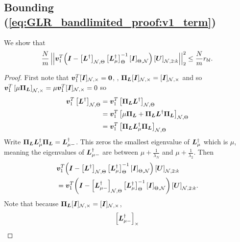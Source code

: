 \subsection{Bounding (\ref{eq:GLR_bandlimited_proof:v1_term})}
We show that 
\begin{equation}
    {\frac{N}{m}}\sqnormvec{\vect{v}_{1}^{T}{\left( \matr{I} - \msubgen[\set{N},\Theta]{\matr{L}^{\dagger}} \msubgen[\Theta]{ \matr{L}_{\mu}^{\dagger}}^{-1}\msubgen[\Theta,\set{N}]{\matr{I}}\right)\msubgen[\set{N},2:k]{\matr{U}}}} \leq \frac{N}{m} r_{bl}.
\end{equation}

\begin{proof} 
First note that $\vect{v}_{1}^{T}\matrsub[N,\Theta]{I} = \vect{0}$, , $\projgen{\matr{L}}\matrsub[N,\Theta]{I} = \matrsub[N,\Theta]{I}$ and so $\vect{v}_{1}^{T}\msub[N,\Theta]{\mu\projgen{\matr{L}}} = \mu \vect{v}_{1}^{T}\matrsub[N,\Theta]{I} = 0$ so 
\begin{align}
\vect{v}_{1}^{T}\msubgen[\set{N},\Theta]{\matr{L}^{\dagger}} &= \vect{v}_{1}^{T} \msubgen[\set{N},\Theta]{\projgen{\matr{L}}\matr{L}^{\dagger}} \\
&= \vect{v}_{1}^{T} \msubgen[\set{N},\Theta]{\mu\projgen{\matr{L}} + \projgen{\matr{L}}\matr{L}^{\dagger}\projgen{\matr{L}}} \\
&= \vect{v}_{1}^{T} \msubgen[\set{N},\Theta]{\projgen{\matr{L}}\matr{L}_{\mu}^{\dagger}\projgen{\matr{L}}} 
\end{align}
Write $\projgen{\matr{L}}\matr{L}^{\dagger}_{\mu}\projgen{\matr{L}} = \matr{L}^{\dagger}_{\mu-}$. This zeros the smallest eigenvalue of $\bm{L}^{\dagger}_{\mu}$ which is $\mu$, meaning the eigenvalues of $\bm{L}^{\dagger}_{\mu-}$ are between $\mu + \frac{1}{\lambda_{N}}$ and $\mu + \frac{1}{\lambda_{2}}$. Then
\begin{align}
    &{\vect{v}_{1}^{T}{\left( \matr{I} - \msubgen[\set{N},\Theta]{\matr{L}^{\dagger}} \msubgen[\Theta]{ \matr{L}_{\mu}^{\dagger}}^{-1}\msubgen[\Theta,\set{N}]{\matr{I}}\right)\msubgen[\set{N},2:k]{\matr{U}}}} \\
    &= {\vect{v}_{1}^{T}{\left( \matr{I} - \msubgen[\set{N},\Theta]{\matr{L}_{\mu -}^{\dagger}} \msubgen[\Theta]{ \matr{L}_{\mu}^{\dagger}}^{-1}\msubgen[\Theta,\set{N}]{\matr{I}}\right)\msubgen[\set{N},2:k]{\matr{U}}}}.
\end{align}
Note that because $\projgen{\matr{L}}\matrsub[N,\Theta]{I} = \matrsub[N,\Theta]{I}$,
\begin{equation}
    \msub[\Theta]{\matr{L}^{\dagger}_{\mu -}}

\end{equation}
\end{proof}
